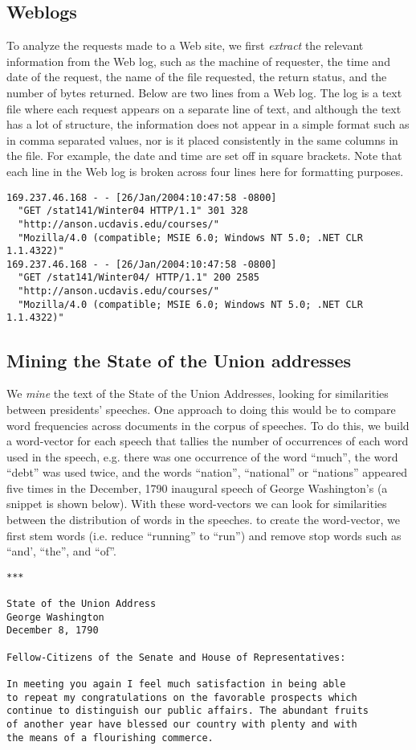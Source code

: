 \subsection{Weblogs}\label{ssec:weblog}
To analyze the requests made to a Web site, we first \textit{extract}
the relevant information from the Web log, such as the machine of
requester, the time and date of the request, the name of the file
requested, the return status, and the number of bytes returned.  Below
are two lines from a Web log.  The log is a text file where each
request appears on a separate line of text, and although the text has
a lot of structure, the information does not appear in a simple format
such as in comma separated values, nor is it placed consistently in
the same columns in the file. For example, the date and time are set
off in square brackets.  Note that each line in the Web log is broken
across four lines here for formatting purposes.  {\footnotesize{
\begin{verbatim}
169.237.46.168 - - [26/Jan/2004:10:47:58 -0800] 
  "GET /stat141/Winter04 HTTP/1.1" 301 328 
  "http://anson.ucdavis.edu/courses/" 
  "Mozilla/4.0 (compatible; MSIE 6.0; Windows NT 5.0; .NET CLR 1.1.4322)"
169.237.46.168 - - [26/Jan/2004:10:47:58 -0800] 
  "GET /stat141/Winter04/ HTTP/1.1" 200 2585 
  "http://anson.ucdavis.edu/courses/" 
  "Mozilla/4.0 (compatible; MSIE 6.0; Windows NT 5.0; .NET CLR 1.1.4322)"
\end{verbatim}
}}

 
\subsection{Mining the State of the Union addresses}\label{ssec:sou}
We \textit{mine} the text of the State of the Union Addresses, looking
for similarities between presidents' speeches.  One approach to doing
this would be to compare word frequencies across documents in the
corpus of speeches.  To do this, we build a word-vector for each
speech that tallies the number of occurrences of each word used in the
speech, e.g. there was one occurrence of the word ``much'', the word
``debt'' was used twice, and the words ``nation'', ``national'' or
``nations'' appeared five times in the December, 1790 inaugural speech
of George Washington's (a snippet is shown below).  With these
word-vectors we can look for similarities between the distribution of
words in the speeches.  to create the word-vector, we first stem words
(i.e. reduce ``running'' to ``run'') and remove stop words such as
``and', ``the'', and ``of''.  {\footnotesize{
\begin{verbatim}
***

State of the Union Address
George Washington
December 8, 1790

Fellow-Citizens of the Senate and House of Representatives:

In meeting you again I feel much satisfaction in being able 
to repeat my congratulations on the favorable prospects which
continue to distinguish our public affairs. The abundant fruits
of another year have blessed our country with plenty and with 
the means of a flourishing commerce.
\end{verbatim}
}}


